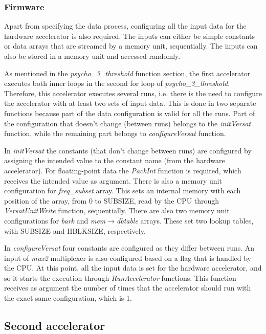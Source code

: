 \subsubsection{Firmware}
Apart from specifying the data process, configuring all the input data for the hardware accelerator is also required. The inputs can either be simple constants or data arrays that are streamed by a memory unit, sequentially. The inputs can also be stored in a memory unit and accessed randomly.

As mentioned in the \textit{psycho\_3\_threshold} function section, the first accelerator executes both inner loops in the second for loop of \textit{psycho\_3\_threshold}.
Therefore, this accelerator executes several runs, i.e. there is the need to configure the accelerator with at least two sets of input data.
This is done in two separate functions because part of the data configuration is valid for all the runs. Part of the configuration that doesn't change (between runs) belongs to the \textit{initVersat} function, while the remaining part belongs to \textit{configureVersat} function.

In \textit{initVersat} the constants (that don't change between runs) are configured by assigning the intended value to the constant name (from the hardware accelerator). For floating-point data the \textit{PackInt} function is required, which receives the intended value as argument.
There is also a memory unit configuration for \textit{freq\_subset} array. This sets an internal memory with each position of the array, from 0 to SUBSIZE, read by the CPU through \textit{VersatUnitWrite} function, sequentially.
There are also two memory unit configurations for \textit{bark} and \textit{mem}$\rightarrow$\textit{dbtable} arrays. These set two lookup tables, with SUBSIZE and HBLKSIZE, respectively.

In \textit{configureVersat} four constants are configured as they differ between runs. An input of \textit{mux2} multiplexer is also configured based on a flag that is handled by the CPU.
At this point, all the input data is set for the hardware accelerator, and so it starts the execution through \textit{RunAccelerator} functions. This function receives as argument the number of times that the accelerator should run with the exact same configuration, which is 1.


\subsection{Second accelerator}

